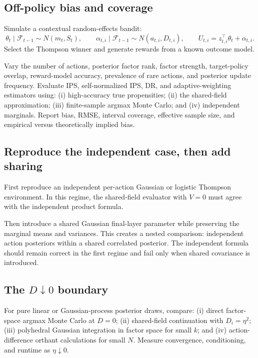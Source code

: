 \documentclass[11pt]{article}
\begin{document}
\subsection{Off-policy bias and coverage}

Simulate a contextual random-effects bandit:
\[
\theta_t \mid \mathcal{F}_{t-1} \sim N(m_t, S_t),
\qquad
\alpha_{t,i} \mid \mathcal{F}_{t-1} \sim N(a_{t,i}, D_{t,i}),
\qquad
U_{t,i} = z_{t,i}^\top \theta_t + \alpha_{t,i}.
\]
Select the Thompson winner and generate rewards from a known outcome model.

Vary the number of actions, posterior factor rank, factor strength, target-policy overlap, reward-model accuracy, prevalence of rare actions, and posterior update frequency. Evaluate IPS, self-normalized IPS, DR, and adaptive-weighting estimators using: (i) high-accuracy true propensities; (ii) the shared-field approximation; (iii) finite-sample argmax Monte Carlo; and (iv) independent marginals. Report bias, RMSE, interval coverage, effective sample size, and empirical versus theoretically implied bias.

\subsection{Reproduce the independent case, then add sharing}

First reproduce an independent per-action Gaussian or logistic Thompson environment. In this regime, the shared-field evaluator with $V = 0$ must agree with the independent product formula.

Then introduce a shared Gaussian final-layer parameter while preserving the marginal means and variances. This creates a nested comparison: independent action posteriors within a shared correlated posterior. The independent formula should remain correct in the first regime and fail only when shared covariance is introduced.

\subsection{The $D \downarrow 0$ boundary}

For pure linear or Gaussian-process posterior draws, compare: (i) direct factor-space argmax Monte Carlo at $D = 0$; (ii) shared-field continuation with $D_i = \eta^2$; (iii) polyhedral Gaussian integration in factor space for small $k$; and (iv) action-difference orthant calculations for small $N$. Measure convergence, conditioning, and runtime as $\eta \downarrow 0$.
\end{document}
